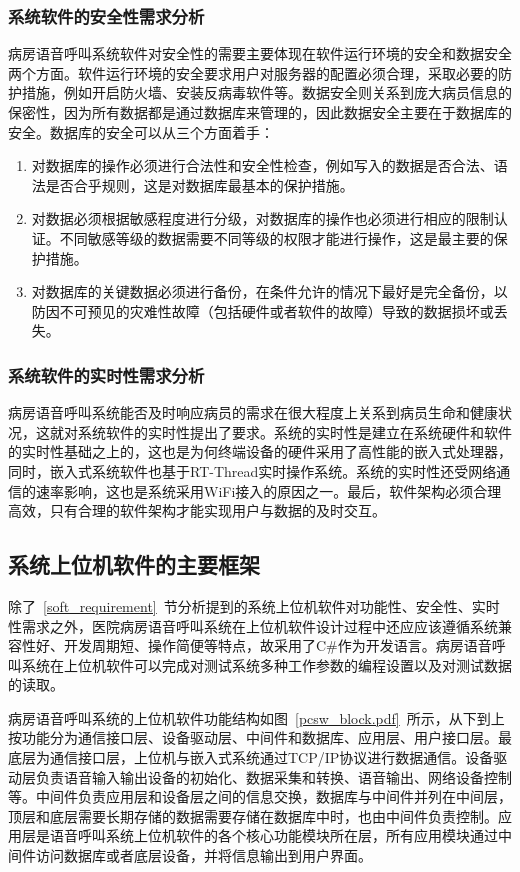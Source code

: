 \subsubsection{系统软件的安全性需求分析}
病房语音呼叫系统软件对安全性的需要主要体现在软件运行环境的安全和数据安全两个方面。软件运行环境的安全要求用户对服务器的配置必须合理，采取必要的防护措施，例如开启防火墙、安装反病毒软件等。数据安全则关系到庞大病员信息的保密性，因为所有数据都是通过数据库来管理的，因此数据安全主要在于数据库的安全。数据库的安全可以从三个方面着手：
\begin{enumerate}
\item 对数据库的操作必须进行合法性和安全性检查，例如写入的数据是否合法、语法是否合乎规则，这是对数据库最基本的保护措施。
\item 对数据必须根据敏感程度进行分级，对数据库的操作也必须进行相应的限制认证。不同敏感等级的数据需要不同等级的权限才能进行操作，这是最主要的保护措施。
\item 对数据库的关键数据必须进行备份，在条件允许的情况下最好是完全备份，以防因不可预见的灾难性故障（包括硬件或者软件的故障）导致的数据损坏或丢失。
\end{enumerate}

\subsubsection{系统软件的实时性需求分析}
病房语音呼叫系统能否及时响应病员的需求在很大程度上关系到病员生命和健康状况，这就对系统软件的实时性提出了要求。系统的实时性是建立在系统硬件和软件的实时性基础之上的，这也是为何终端设备的硬件采用了高性能的嵌入式处理器，同时，嵌入式系统软件也基于RT-Thread实时操作系统。系统的实时性还受网络通信的速率影响，这也是系统采用\acrshort{WiFi}接入的原因之一。最后，软件架构必须合理高效，只有合理的软件架构才能实现用户与数据的及时交互。

\subsection{系统上位机软件的主要框架}
除了~\ref{soft_requirement}~节分析提到的系统上位机软件对功能性、安全性、实时性需求之外，医院病房语音呼叫系统在上位机软件设计过程中还应应该遵循系统兼容性好、开发周期短、操作简便等特点，故采用了C{\#}作为开发语言。病房语音呼叫系统在上位机软件可以完成对测试系统多种工作参数的编程设置以及对测试数据的读取。

病房语音呼叫系统的上位机软件功能结构如图~\ref{pcsw_block.pdf}~所示，从下到上按功能分为通信接口层、设备驱动层、中间件和数据库、应用层、用户接口层。最底层为通信接口层，上位机与嵌入式系统通过TCP/IP协议进行数据通信。设备驱动层负责语音输入输出设备的初始化、数据采集和转换、语音输出、网络设备控制等。中间件负责应用层和设备层之间的信息交换，数据库与中间件并列在中间层，顶层和底层需要长期存储的数据需要存储在数据库中时，也由中间件负责控制。应用层是语音呼叫系统上位机软件的各个核心功能模块所在层，所有应用模块通过中间件访问数据库或者底层设备，并将信息输出到用户界面。

